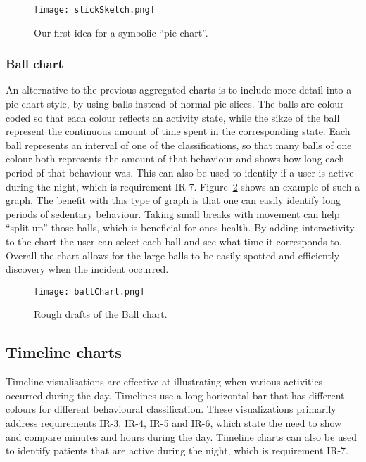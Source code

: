 \begin{figure}[h!]
	\centering
		\texttt{[image: stickSketch.png]}
		\caption{\footnotesize Our first idea for a symbolic ``pie chart''.}
		\label{fig:symbolicPie}
\end{figure}

\subsubsection{Ball chart}
An alternative to the previous aggregated charts is to include more detail into a pie chart style, by using balls instead of normal pie slices. The balls are colour coded so that each colour reflects an activity state, while the sikze of the ball represent the continuous amount of time spent in the corresponding state. Each ball represents an interval of one of the classifications, so that many balls of one colour both represents the amount of that behaviour and shows how long each period of that behaviour was. This can also be used to identify if a user is active during the night, which is requirement IR-7. Figure~\ref{fig:ballChart} shows an example of such a graph. The benefit with this type of graph is that one can easily identify long periods of sedentary behaviour. Taking small breaks with movement can help ``split up'' those balls, which is beneficial for ones health. By adding interactivity to the chart the user can select each ball and see what time it corresponds to. Overall the chart allows for the large balls to be easily spotted and efficiently discovery when the incident occurred.

\begin{figure}[h!]
	\centering
		\texttt{[image: ballChart.png]}
		\caption{\footnotesize Rough drafts of the Ball chart.}
		\label{fig:ballChart}
\end{figure}

\subsection{Timeline charts}
Timeline visualisations are effective at illustrating when various activities occurred during the day. Timelines use a long horizontal bar that has different colours for different behavioural classification. These visualizations primarily address requirements IR-3, IR-4, IR-5 and IR-6, which state the need to show and compare minutes and hours during the day. Timeline charts can also be used to identify patients that are active during the night, which is requirement IR-7.

